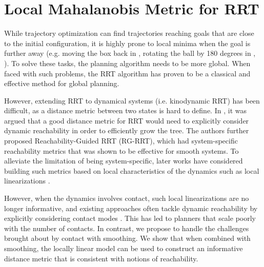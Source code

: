 \section{Local Mahalanobis Metric for RRT}
\label{sec:mahalanobis}
\noindent While trajectory optimization can find trajectories reaching goals that are close to the initial configuration, it is highly prone to local minima when the goal is further away (e.g. moving the box back in , rotating the ball by 180 degrees in , ). To solve these tasks, the planning algorithm needs to be more global. When faced with such problems, the RRT algorithm \cite{lavalle1998rapidly} has proven to be a classical and effective method for global planning. 

However, extending RRT to dynamical systems (i.e. kinodynamic RRT) has been difficult, as a distance metric between two states is hard to define. In \cite{shkolnik2009reachability}, it was argued that a good distance metric for RRT would need to explicitly consider dynamic reachability in order to efficiently grow the tree. The authors further proposed Reachability-Guided RRT (RG-RRT), which had system-specific reachability metrics that was shown to be effective for smooth systems. To alleviate the limitation of being system-specific, later works have considered building such metrics based on local characteristics of the dynamics such as local linearizations \cite{haddad2021anytime,wu2020r3t}.

However, when the dynamics involves contact, such local linearizations are no longer informative, and existing approaches often tackle dynamic reachability by explicitly considering contact modes \cite{chen2021trajectotree,cheng2021contact}. This has led to planners that scale poorly with the number of contacts. In contrast, we propose to handle the challenges brought about by contact with smoothing. We show that when combined with smoothing, the locally linear model can be used to construct an informative distance metric that is consistent with notions of reachability. 

